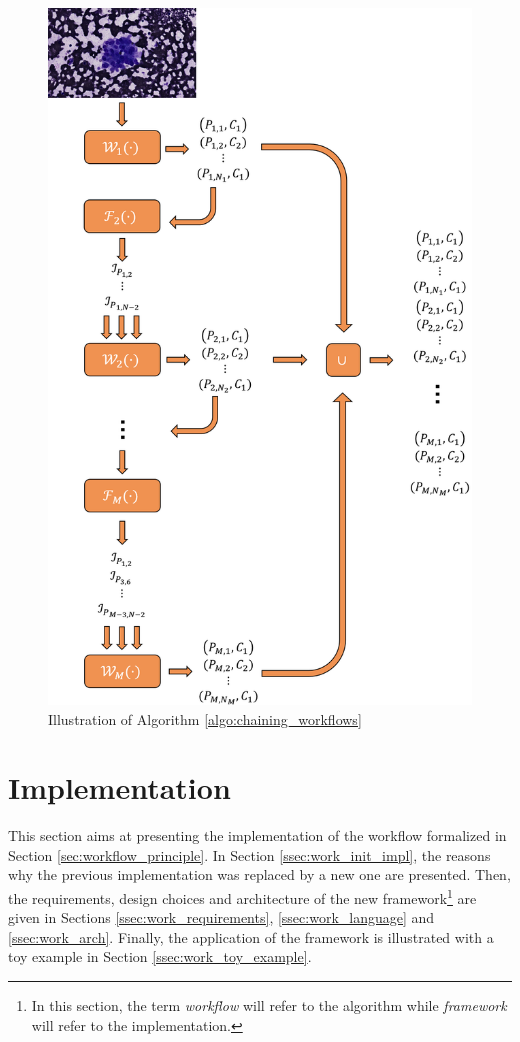 \begin{figure}
	\center
	\includegraphics[scale=0.75]{image/chaining_illustration.png}
	\caption{Illustration of Algorithm \ref{algo:chaining_workflows}}
	\label{fig:chaining_illustration}
\end{figure}
\section{Implementation}
\label{sec:workflow_impl}
This section aims at presenting the implementation of the workflow formalized in Section \ref{sec:workflow_principle}. In Section \ref{ssec:work_init_impl}, the reasons why the previous implementation was replaced by a new one are presented. Then, the requirements, design choices and architecture of the new framework\footnote{In this section, the term \textit{workflow} will refer to the algorithm while \textit{framework} will refer to the implementation.} are given in Sections \ref{ssec:work_requirements}, \ref{ssec:work_language} and \ref{ssec:work_arch}. Finally, the application of the framework is illustrated with a toy example in Section \ref{ssec:work_toy_example}. 

